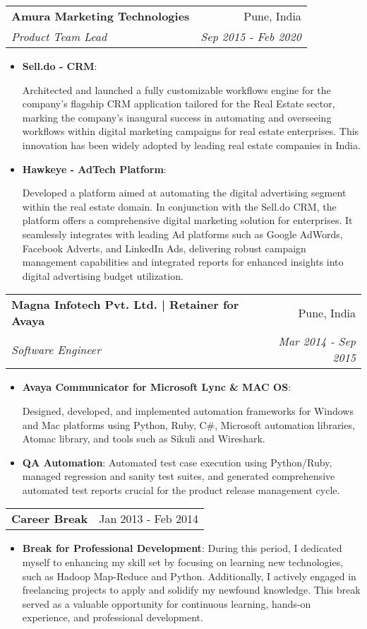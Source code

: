 \documentclass[letterpaper,11pt]{article}
\makeatletter
\newcommand{\resumeItem}[2]{
  \item\small{
    \textbf{#1}{: #2 \vspace{-2pt}}
  }
}
\newcommand{\resumeSubheading}[4]{
  \vspace{-1pt}\item
    \begin{tabular*}{0.97\textwidth}[t]{l@{\extracolsep{\fill}}r}
      \textbf{#1} & #2 \\
      \textit{\small#3} & \textit{\small #4} \\
    \end{tabular*}\vspace{-5pt}
}
\newcommand{\resumeSubSubheading}[2]{
  \vspace{-1pt}\item
    \begin{tabular*}{0.97\textwidth}[t]{l@{\extracolsep{\fill}}r}
      \textbf{#1} & #2 \\
    \end{tabular*}\vspace{-5pt}
}
\newcommand{\resumeSubHeadingListEnd}{\end{itemize}}
\newcommand{\resumeItemListStart}{\begin{itemize}}
\newcommand{\resumeItemListEnd}{\end{itemize}\vspace{-5pt}}
\makeatother
\begin{document}
    \resumeSubheading
      {Amura Marketing Technologies}{Pune, India}
      {Product Team Lead}{Sep 2015 - Feb 2020}
      \resumeItemListStart
        \resumeItem{Sell.do - CRM} \newline
          {Architected and launched a fully customizable workflows engine for the company's flagship CRM application tailored for the Real Estate sector, marking the company's inaugural success in automating and overseeing workflows within digital marketing campaigns for real estate enterprises. This innovation has been widely adopted by leading real estate companies in India.}
        \resumeItem{Hawkeye - AdTech Platform} \newline
          {Developed a platform aimed at automating the digital advertising segment within the real estate domain. In conjunction with the Sell.do CRM, the platform offers a comprehensive digital marketing solution for enterprises. It seamlessly integrates with leading Ad platforms such as Google AdWords, Facebook Adverts, and LinkedIn Ads, delivering robust campaign management capabilities and integrated reports for enhanced insights into digital advertising budget utilization.}
      \resumeItemListEnd


    \resumeSubheading
      {Magna Infotech Pvt. Ltd. | Retainer for Avaya}{Pune, India}
      {Software Engineer}{Mar 2014 - Sep 2015}
      \resumeItemListStart
        \resumeItem{Avaya Communicator for Microsoft Lync \& MAC OS} \newline
          {Designed, developed, and implemented automation frameworks for Windows and Mac platforms using Python, Ruby, C\#, Microsoft automation libraries, Atomac library, and tools such as Sikuli and Wireshark.}
        \resumeItem{QA Automation}
          {Automated test case execution using Python/Ruby, managed regression and sanity test suites, and generated comprehensive automated test reports crucial for the product release management cycle.}
      \resumeItemListEnd

    \resumeSubSubheading
      {Career Break}{Jan 2013 - Feb 2014}
      \resumeItemListStart
        \resumeItem{Break for Professional Development}
          {During this period, I dedicated myself to enhancing my skill set by focusing on learning new technologies, such as Hadoop Map-Reduce and Python. Additionally, I actively engaged in freelancing projects to apply and solidify my newfound knowledge. This break served as a valuable opportunity for continuous learning, hands-on experience, and professional development.}
      \resumeItemListEnd
\end{document}
